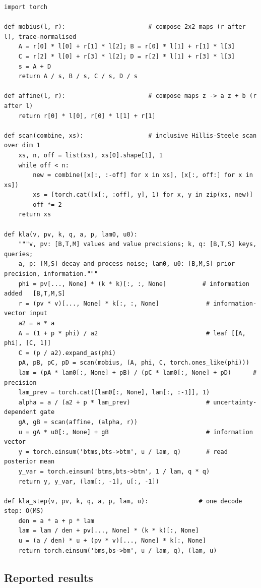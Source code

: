 \begin{lstlisting}[caption={Reference implementation (ours): the KLA core as two scans, plus the decode step.},label={lst:c08-kla-ours}]
import torch

def mobius(l, r):                       # compose 2x2 maps (r after l), trace-normalised
    A = r[0] * l[0] + r[1] * l[2]; B = r[0] * l[1] + r[1] * l[3]
    C = r[2] * l[0] + r[3] * l[2]; D = r[2] * l[1] + r[3] * l[3]
    s = A + D
    return A / s, B / s, C / s, D / s

def affine(l, r):                       # compose maps z -> a z + b (r after l)
    return r[0] * l[0], r[0] * l[1] + r[1]

def scan(combine, xs):                  # inclusive Hillis-Steele scan over dim 1
    xs, n, off = list(xs), xs[0].shape[1], 1
    while off < n:
        new = combine([x[:, :-off] for x in xs], [x[:, off:] for x in xs])
        xs = [torch.cat([x[:, :off], y], 1) for x, y in zip(xs, new)]
        off *= 2
    return xs

def kla(v, pv, k, q, a, p, lam0, u0):
    """v, pv: [B,T,M] values and value precisions; k, q: [B,T,S] keys, queries;
    a, p: [M,S] decay and process noise; lam0, u0: [B,M,S] prior precision, information."""
    phi = pv[..., None] * (k * k)[:, :, None]          # information added   [B,T,M,S]
    r = (pv * v)[..., None] * k[:, :, None]             # information-vector input
    a2 = a * a
    A = (1 + p * phi) / a2                              # leaf [[A, phi], [C, 1]]
    C = (p / a2).expand_as(phi)
    pA, pB, pC, pD = scan(mobius, (A, phi, C, torch.ones_like(phi)))
    lam = (pA * lam0[:, None] + pB) / (pC * lam0[:, None] + pD)      # precision
    lam_prev = torch.cat([lam0[:, None], lam[:, :-1]], 1)
    alpha = a / (a2 + p * lam_prev)                     # uncertainty-dependent gate
    gA, gB = scan(affine, (alpha, r))
    u = gA * u0[:, None] + gB                           # information vector
    y = torch.einsum('btms,bts->btm', u / lam, q)       # read posterior mean
    y_var = torch.einsum('btms,bts->btm', 1 / lam, q * q)
    return y, y_var, (lam[:, -1], u[:, -1])

def kla_step(v, pv, k, q, a, p, lam, u):              # one decode step: O(MS)
    den = a * a + p * lam
    lam = lam / den + pv[..., None] * (k * k)[:, None]
    u = (a / den) * u + (pv * v)[..., None] * k[:, None]
    return torch.einsum('bms,bs->bm', u / lam, q), (lam, u)
\end{lstlisting}

\subsection{Reported results}

